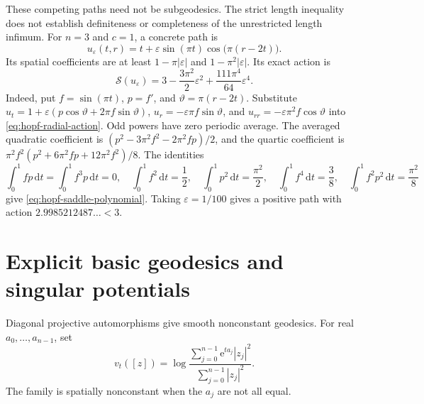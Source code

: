 These competing paths need not be subgeodesics. The strict length inequality does not establish definiteness or completeness of the unrestricted length infimum. For $n=3$ and $c=1$, a concrete path is
\[
 u_\varepsilon(t,r)=t+\varepsilon\sin(\pi t)\cos\bigl(\pi(r-2t)\bigr).
\]
Its spatial coefficients are at least $1-\pi|\varepsilon|$ and $1-\pi^2|\varepsilon|$. Its exact action is
\begin{equation}\label{eq:hopf-saddle-polynomial}
 \mathscr S(u_\varepsilon)
 =3-\frac{3\pi^2}2\varepsilon^2+\frac{111\pi^4}{64}\varepsilon^4.
\end{equation}
Indeed, put $f=\sin(\pi t)$, $p=f'$, and $\vartheta=\pi(r-2t)$. Substitute
$u_t=1+\varepsilon(p\cos\vartheta+2\pi f\sin\vartheta)$,
$u_r=-\varepsilon\pi f\sin\vartheta$, and $u_{rr}=-\varepsilon\pi^2f\cos\vartheta$ into \eqref{eq:hopf-radial-action}. Odd powers have zero periodic average. The averaged quadratic coefficient is $(p^2-3\pi^2f^2-2\pi^2fp)/2$, and the quartic coefficient is $\pi^2f^2(p^2+6\pi^2fp+12\pi^2f^2)/8$. The identities
\[
 \int_0^1fp\,\mathrm dt=\int_0^1f^3p\,\mathrm dt=0,
 \quad \int_0^1f^2\,\mathrm dt=\frac12,
 \quad \int_0^1p^2\,\mathrm dt=\frac{\pi^2}2,
 \quad \int_0^1f^4\,\mathrm dt=\frac38,
 \quad \int_0^1f^2p^2\,\mathrm dt=\frac{\pi^2}8
\]
give \eqref{eq:hopf-saddle-polynomial}. Taking $\varepsilon=1/100$ gives a positive path with action $2.9985212487\ldots<3$.

\section{Explicit basic geodesics and singular potentials}

Diagonal projective automorphisms give smooth nonconstant geodesics. For real $a_0,\ldots,a_{n-1}$, set
\[
 v_t([z])=\log\frac{\sum_{j=0}^{n-1}\mathrm e^{ta_j}|z_j|^2}
 {\sum_{j=0}^{n-1}|z_j|^2}.
\]
The family is spatially nonconstant when the $a_j$ are not all equal.

